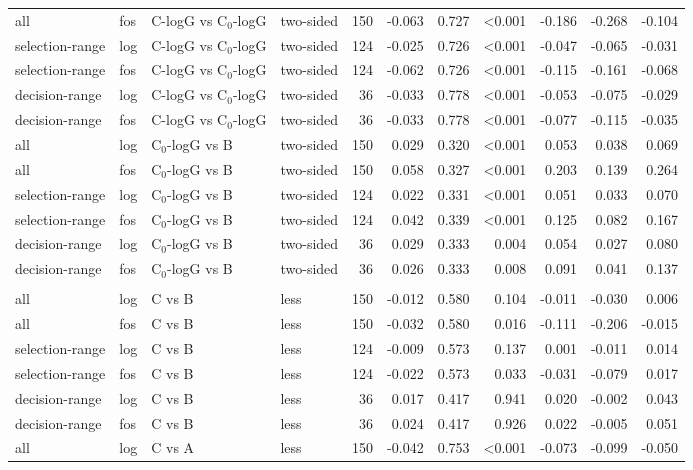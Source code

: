 \begin{longtable}{llllrrrrrrr}
all & fos & C-logG vs C$_0$-logG & two-sided & 150 & -0.063 & 0.727 & <0.001 & -0.186 & -0.268 & -0.104 \\
selection-range & log & C-logG vs C$_0$-logG & two-sided & 124 & -0.025 & 0.726 & <0.001 & -0.047 & -0.065 & -0.031 \\
selection-range & fos & C-logG vs C$_0$-logG & two-sided & 124 & -0.062 & 0.726 & <0.001 & -0.115 & -0.161 & -0.068 \\
decision-range & log & C-logG vs C$_0$-logG & two-sided & 36 & -0.033 & 0.778 & <0.001 & -0.053 & -0.075 & -0.029 \\
decision-range & fos & C-logG vs C$_0$-logG & two-sided & 36 & -0.033 & 0.778 & <0.001 & -0.077 & -0.115 & -0.035 \\
all & log & C$_0$-logG vs B & two-sided & 150 & 0.029 & 0.320 & <0.001 & 0.053 & 0.038 & 0.069 \\
all & fos & C$_0$-logG vs B & two-sided & 150 & 0.058 & 0.327 & <0.001 & 0.203 & 0.139 & 0.264 \\
selection-range & log & C$_0$-logG vs B & two-sided & 124 & 0.022 & 0.331 & <0.001 & 0.051 & 0.033 & 0.070 \\
selection-range & fos & C$_0$-logG vs B & two-sided & 124 & 0.042 & 0.339 & <0.001 & 0.125 & 0.082 & 0.167 \\
decision-range & log & C$_0$-logG vs B & two-sided & 36 & 0.029 & 0.333 & 0.004 & 0.054 & 0.027 & 0.080 \\
decision-range & fos & C$_0$-logG vs B & two-sided & 36 & 0.026 & 0.333 & 0.008 & 0.091 & 0.041 & 0.137 \\
\addlinespace
\multicolumn{11}{l}{\textit{RF}} \\
all & log & C vs B & less & 150 & -0.012 & 0.580 & 0.104 & -0.011 & -0.030 & 0.006 \\
all & fos & C vs B & less & 150 & -0.032 & 0.580 & 0.016 & -0.111 & -0.206 & -0.015 \\
selection-range & log & C vs B & less & 124 & -0.009 & 0.573 & 0.137 & 0.001 & -0.011 & 0.014 \\
selection-range & fos & C vs B & less & 124 & -0.022 & 0.573 & 0.033 & -0.031 & -0.079 & 0.017 \\
decision-range & log & C vs B & less & 36 & 0.017 & 0.417 & 0.941 & 0.020 & -0.002 & 0.043 \\
decision-range & fos & C vs B & less & 36 & 0.024 & 0.417 & 0.926 & 0.022 & -0.005 & 0.051 \\
all & log & C vs A & less & 150 & -0.042 & 0.753 & <0.001 & -0.073 & -0.099 & -0.050 \\

\end{longtable}
